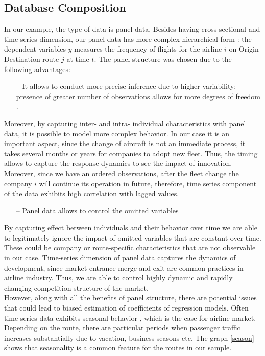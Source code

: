 \documentclass[titlepage, 11pt]{article}
\begin{document}
\subsection{Database Composition} \label{data composition}
\tab In our example, the type of data is panel data. Besides having cross sectional and time series dimension, our panel data has more complex hierarchical form \cite{Hsiao}: the dependent variables $y$ measures the frequency of flights for the airline $i$ on Origin-Destination route $j$ at time $t$.  The panel structure was chosen due to the following advantages\cite{Hsiao}: 
\begin{itemize}
\item[--] It allows to conduct more precise inference due to higher variability: presence of greater number of observations allows for more degrees of freedom \cite{Hsiao}.
\end{itemize}
\tab Moreover, by capturing inter- and intra- individual characteristics with panel data, it is possible to model more complex behavior. In our case it is an important aspect, since the change of aircraft is not an immediate process, it takes several months or years for companies to adopt new fleet. Thus, the timing allows to capture the response dynamics to see the impact of innovation. Moreover, since we have an ordered observations, after the fleet change the company $i$ will continue its operation in future, therefore, time series component of the data exhibits high correlation with lagged values.
\begin{itemize}
\item[--] Panel data allows to control the omitted variables \cite{Hsiao}
\end{itemize}
\tab By capturing effect between individuals and their behavior over time we are able to legitimately ignore the impact of omitted variables that are constant over time. These could be company or route-specific characteristics that are not observable in our case. 
Time-series dimension of panel data captures the dynamics of development, since market entrance merge and exit are common practices in airline industry. Thus, we are able to control highly dynamic and rapidly changing competition structure of the market.\\
\tab However, along with all the benefits of panel structure, there are potential issues that could lead to biased estimation of coefficients of regression models. Often time-series data exhibits seasonal behavior \cite{Hsiao}, which is the case for airline market. Depending on the route, there are particular periods when passenger traffic increases substantially due to vacation, business seasons etc. The graph \ref{season} shows that seasonality is a common feature for the routes in our sample.
\end{document}
